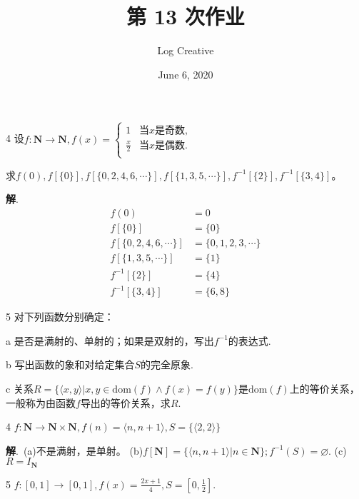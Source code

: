 \documentclass[12pt]{article}
\title{第 13 次作业}
\author{Log Creative}
\date{June 6, 2020}
\newenvironment{firstlayer}%
{\begin{list}{}{\renewcommand{\makelabel}[1]{\textbf{##1}.\hfil}
}}
{\end{list}}
\newenvironment{secondlayer}%
{\begin{list}{}{\renewcommand{\makelabel}[1]{(##1)\hfil}
}}
{\end{list}}
\providecommand{\sol}{\textbf{解}.~}
\begin{document}
\begin{CJK}{UTF8}{gbsn}

\maketitle

\begin{firstlayer}
  \item[4] 设$f:\mathbf{N}\rightarrow\mathbf{N},f(x)=\begin{cases}
    1 & \text{当}x\text{是奇数,} \\
    \frac{x}{2} & \text{当}x\text{是偶数.} \\
\end{cases}$

求$f(0),f[\{0\}],f[\{0,2,4,6,\cdots\}],f[\{1,3,5,\cdots\}],f^{-1}[\{2\}],f^{-1}[\{3,4\}]$。

\sol \begin{align*}
    f(0)&=0\\
    f[\{0\}]&=\{0\}\\
    f[\{0,2,4,6,\cdots\}]&=\{0,1,2,3,\cdots\}\\
    f[\{1,3,5,\cdots\}]&=\{1\}\\
    f^{-1}[\{2\}]&=\{4\}\\
    f^{-1}[\{3,4\}]&=\{6,8\}
\end{align*}

\item[5] 对下列函数分别确定：
\begin{secondlayer}
  \item[a]是否是满射的、单射的；如果是双射的，写出$f^{-1}$的表达式.
  \item[b]写出函数的象和对给定集合$S$的完全原象.
  \item[c]关系$R=\{\langle x,y \rangle|x,y\in\text{dom}(f)\wedge f(x)=f(y)\}$是$\text{dom}(f)$上的等价关系，一般称为由函数$f$导出的等价关系，求$R$.
\end{secondlayer}
\begin{secondlayer}
  \item[4]$f:\mathbf{N}\rightarrow\mathbf{N}\times\mathbf{N},f(n)=\langle n,n+1 \rangle,S=\{\langle 2,2 \rangle\}$
  
  \sol (a)不是满射，是单射。
(b)$f[\mathbf{N}]=\{\langle n,n+1 \rangle|n\in \mathbf{N}\};f^{-1}(S)=\varnothing$.
(c)$R=I_{\mathbf{N}}$

    \item[5]$f:[0,1]\rightarrow[0,1],f(x)=\frac{2x+1}{4},S=\left[0,\frac{1}{2}\right]$.


\end{secondlayer}
\end{firstlayer}
\end{CJK}
\end{document}
